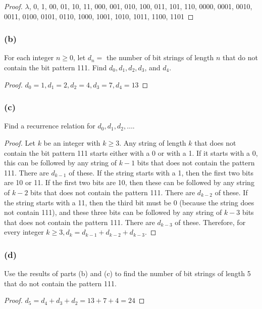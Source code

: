 \documentclass[14pt]{extarticle}
\begin{document}
\begin{proof}
\(\lambda\), 0, 1, 00, 01, 10, 11, 000, 001, 010, 100, 011, 101, 110, 0000, 0001, 0010, 0011, 0100, 0101, 0110, 1000, 1001, 1010, 1011, 1100, 1101
\end{proof}

\subsubsection{(b)}
For each integer \(n \geq 0\), let \(d_n =\) the number of bit strings of length $n$ that do not contain the bit 
pattern 111. Find \(d_0, d_1, d_2, d_3\), and \(d_4\).

\begin{proof}
\(d_0 = 1, d_1 = 2, d_2 = 4, d_3 = 7, d_4 = 13\)
\end{proof}

\subsubsection{(c)}
Find a recurrence relation for \(d_0, d_1, d_2, \ldots\).

\begin{proof}
Let $k$ be an integer with \(k \geq 3\). Any string of length $k$ that does not contain the bit pattern 111 starts 
either with a 0 or with a 1. If it starts with a 0, this can be followed by any string of \(k - 1\) bits that does 
not contain the pattern 111. There are \(d_{k-1}\) of these. If the string starts with a 1, then the first two 
bits are 10 or 11. If the first two bits are 10, then these can be followed by any string of \(k - 2\) bits that does 
not contain the pattern 111. There are \(d_{k-2}\) of these. If the string starts with a 11, then the third bit 
must be 0 (because the string does not contain 111), and these three bits can be followed by any string of \(k - 3\) 
bits that does not contain the pattern 111. There are \(d_{k-3}\) of these. Therefore, for every integer 
\(k \geq 3, d_k = d_{k-1} + d_{k-2} + d_{k-3}\).
\end{proof}

\subsubsection{(d)}
Use the results of parts (b) and (c) to find the number of bit strings of length 5 that do not contain the pattern 
111.

\begin{proof}
\(d_5 = d_4 + d_3 + d_2 = 13+7+4 = 24\)
\end{proof}
\end{document}

